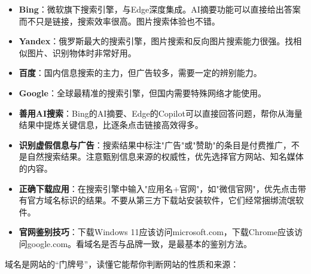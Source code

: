 
\begin{itemize}
  \item \textbf{Bing}：微软旗下搜索引擎，与Edge深度集成。AI摘要功能可以直接给出答案而不只是链接，搜索效率很高。图片搜索体验也不错。
  \item \textbf{Yandex}：俄罗斯最大的搜索引擎，图片搜索和反向图片搜索能力很强。找相似图片、识别物体时非常好用。
  \item \textbf{百度}：国内信息搜索的主力，但广告较多，需要一定的辨别能力。
  \item \textbf{Google}：全球最精准的搜索引擎，但国内需要特殊网络才能使用。
\end{itemize}


\begin{itemize}
  \item \textbf{善用AI搜索}：Bing的AI摘要、Edge的Copilot可以直接回答问题，帮你从海量结果中提炼关键信息，比逐条点击链接高效得多。
  \item \textbf{识别虚假信息与广告}：搜索结果中标注"广告"或"赞助"的条目是付费推广，不是自然搜索结果。注意甄别信息来源的权威性，优先选择官方网站、知名媒体的内容。
  \item \textbf{正确下载应用}：在搜索引擎中输入"应用名+官网"，如"微信官网"，优先点击带有官方域名标识的结果。不要从第三方下载站安装软件，它们经常捆绑流氓软件。
  \item \textbf{官网鉴别技巧}：下载Windows 11应该访问microsoft.com，下载Chrome应该访问google.com。看域名是否与品牌一致，是最基本的鉴别方法。
\end{itemize}


域名是网站的“门牌号”，读懂它能帮你判断网站的性质和来源：

